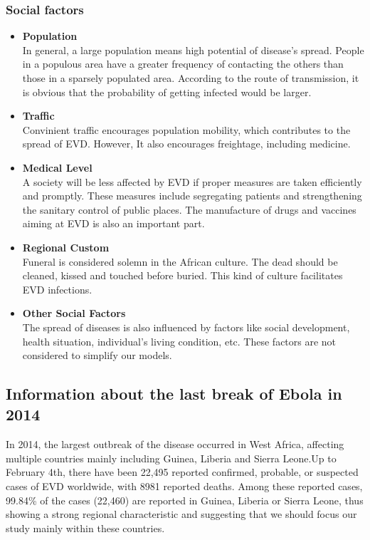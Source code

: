 \subsubsection{Social factors}
\begin{itemize}
  \item \textbf{Population}\\In general, a large population means high potential of disease's spread. People in a populous area have a greater frequency of contacting the others than those in a sparsely populated area. According to the route of transmission, it is obvious that the probability of getting infected would be larger.
   
  \item \textbf{Traffic}\\Convinient traffic encourages population mobility, which contributes to the spread of EVD. However, It also encourages freightage, including medicine.
  
  \item \textbf{Medical Level}\\A society will be less affected by EVD if proper measures are taken efficiently and promptly.
   These measures include segregating patients and strengthening the sanitary control of public places. The manufacture of drugs and vaccines aiming at EVD is also an important part.
  
  \item \textbf{Regional Custom}\\Funeral is considered solemn in the African culture. The dead should be cleaned, kissed and touched before buried. This kind of culture facilitates EVD infections.
  
  \item \textbf{Other Social Factors}\\The spread of diseases is also influenced by factors like social development, health situation, individual's living condition, etc. These factors are not considered to simplify our models.
\end{itemize}

\subsection{Information about the last break of Ebola in 2014}

\par In 2014, the largest outbreak of the disease occurred in West Africa, affecting multiple countries mainly including Guinea, Liberia and Sierra Leone.\cite{CDC}Up to February 4th, there have been 22,495 reported confirmed, probable, or suspected cases of EVD worldwide, with 8981 reported deaths. Among these reported cases, 99.84\% of the cases (22,460) are reported in Guinea, Liberia or Sierra Leone, thus showing a strong regional characteristic and suggesting that we should focus our study mainly within these countries.